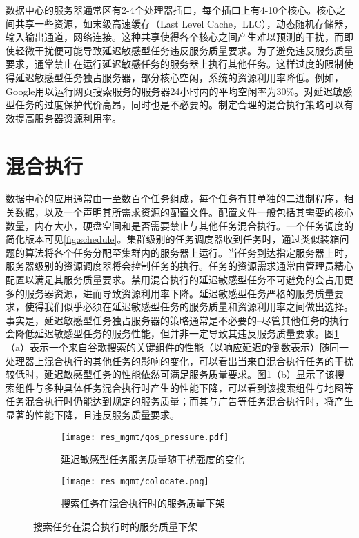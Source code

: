 数据中心的服务器通常区有2-4个处理器插口，每个插口上有4-10个核心。核心之间共享一些资源，如末级高速缓存（Last Level Cache，LLC），动态随机存储器，输入输出通道，网络连接。这种共享使得各个核心之间产生难以预测的干扰，而即使轻微干扰便可能导致延迟敏感型任务违反服务质量要求\cite{janapa2010web}\cite{nesbit2006fair}\cite{meisner2011power}。为了避免违反服务质量要求，通常禁止在运行延迟敏感任务的服务器上执行其他任务。这样过度的限制使得延迟敏感型任务独占服务器，部分核心空闲，系统的资源利用率降低。例如，Google用以运行网页搜索服务的服务器24小时内的平均空闲率为30\%\cite{lo2014towards}。对延迟敏感型任务的过度保护代价高昂，同时也是不必要的。制定合理的混合执行策略可以有效提高服务器资源利用率\cite{delimitrou2013paragon}\cite{mars2011bubble}\cite{marshall2011improving}。

\section{混合执行}
数据中心的应用通常由一至数百个任务组成，每个任务有其单独的二进制程序，相关数据，以及一个声明其所需求资源的配置文件\cite{mishra2010towards}。配置文件一般包括其需要的核心数量，内存大小，硬盘空间和是否需要禁止与其他任务混合执行。一个任务调度的简化版本可见\ref{fig:schedule}。集群级别的任务调度器收到任务时，通过类似装箱问题的算法将各个任务分配至集群内的服务器上运行\cite{mishra2010towards}。当任务到达指定服务器上时，服务器级别的资源调度器将会控制任务的执行\cite{banga1999resource}。任务的资源需求通常由管理员精心配置以满足其服务质量要求。禁用混合执行的延迟敏感型任务不可避免的会占用更多的服务器资源，进而导致资源利用率下降。延迟敏感型任务严格的服务质量要求，使得我们似乎必须在延迟敏感型任务的服务质量和资源利用率之间做出选择。事实是，延迟敏感型任务独占服务器的策略通常是不必要的--尽管其他任务的执行会降低延迟敏感型任务的服务性能，但并非一定导致其违反服务质量要求。图\ref{fig:colocate}（a）表示一个来自谷歌搜索的关键组件的性能（以响应延迟的倒数表示）随同一处理器上混合执行的其他任务的影响的变化，可以看出当来自混合执行任务的干扰较低时，延迟敏感型任务的性能依然可满足服务质量要求\cite{mars2011bubble}。图\ref{fig:colocate}（b）显示了该搜索组件与多种具体任务混合执行时产生的性能下降，可以看到该搜索组件与地图等任务混合执行时仍能达到规定的服务质量；而其与广告等任务混合执行时，将产生显著的性能下降，且违反服务质量要求。

\begin{figure}
  \centering
  \begin{subfigure}{0.4\textwidth}
    \centering
    \texttt{[image: res\_mgmt/qos\_pressure.pdf]}
    \caption{延迟敏感型任务服务质量随干扰强度的变化}
  \end{subfigure}
  \hspace{1em}
  \begin{subfigure}{0.55\textwidth}
    \centering
    \texttt{[image: res\_mgmt/colocate.png]}
    \caption{搜索任务在混合执行时的服务质量下架}
  \end{subfigure}
  \label{fig:colocate}
\end{figure}

